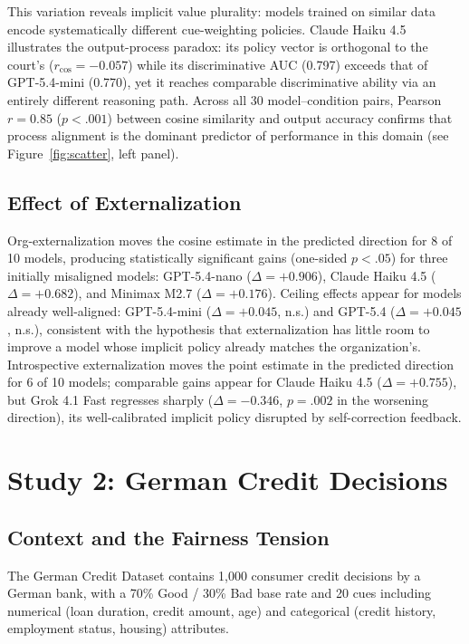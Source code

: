 \documentclass{article}
\begin{document}
This variation reveals implicit value plurality: models trained on similar data encode systematically different cue-weighting policies. Claude Haiku 4.5 illustrates the output-process paradox: its policy vector is orthogonal to the court's ($r_{\cos} = -0.057$) while its discriminative AUC (0.797) exceeds that of GPT-5.4-mini (0.770), yet it reaches comparable discriminative ability via an entirely different reasoning path. Across all 30 model--condition pairs, Pearson $r = 0.85$ ($p < .001$) between cosine similarity and output accuracy confirms that process alignment is the dominant predictor of performance in this domain (see Figure~\ref{fig:scatter}, left panel).

\subsection{Effect of Externalization}

Org-externalization moves the cosine estimate in the predicted direction for 8 of 10 models, producing statistically significant gains (one-sided $p < .05$) for three initially misaligned models: GPT-5.4-nano ($\Delta = +0.906$), Claude Haiku 4.5 ($\Delta = +0.682$), and Minimax M2.7 ($\Delta = +0.176$). Ceiling effects appear for models already well-aligned: GPT-5.4-mini ($\Delta = +0.045$, n.s.) and GPT-5.4 ($\Delta = +0.045$, n.s.), consistent with the hypothesis that externalization has little room to improve a model whose implicit policy already matches the organization's. Introspective externalization moves the point estimate in the predicted direction for 6 of 10 models; comparable gains appear for Claude Haiku 4.5 ($\Delta = +0.755$), but Grok 4.1 Fast regresses sharply ($\Delta = -0.346$, $p = .002$ in the worsening direction), its well-calibrated implicit policy disrupted by self-correction feedback.


\section{Study 2: German Credit Decisions}

\subsection{Context and the Fairness Tension}

The German Credit Dataset \citep{hofmann1994statlog} contains 1,000 consumer credit decisions by a German bank, with a 70\% Good / 30\% Bad base rate and 20 cues including numerical (loan duration, credit amount, age) and categorical (credit history, employment status, housing) attributes.
\end{document}

